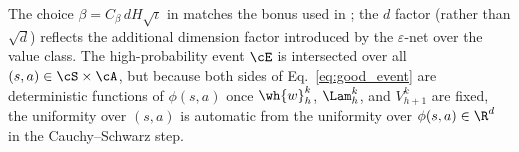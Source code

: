\begin{remark}\label{rem:concentration_summary}
The choice $\beta = C_\beta\, d H \sqrt{\iota}$ in  matches the bonus used in \cite{jin2020provably}; the $d$ factor (rather than $\sqrt{d}$) reflects the additional dimension factor introduced by the $\varepsilon$-net over the value class. The high-probability event $\cE$ is intersected over all $(s, a) \in \cS \times \cA$, but because both sides of Eq.~\eqref{eq:good_event} are deterministic functions of $\phi(s, a)$ once $\wh{w}_h^k$, $\Lam_h^k$, and $V_{h+1}^k$ are fixed, the uniformity over $(s, a)$ is automatic from the uniformity over $\phi(s, a) \in \R^d$ in the Cauchy--Schwarz step.
\end{remark}
